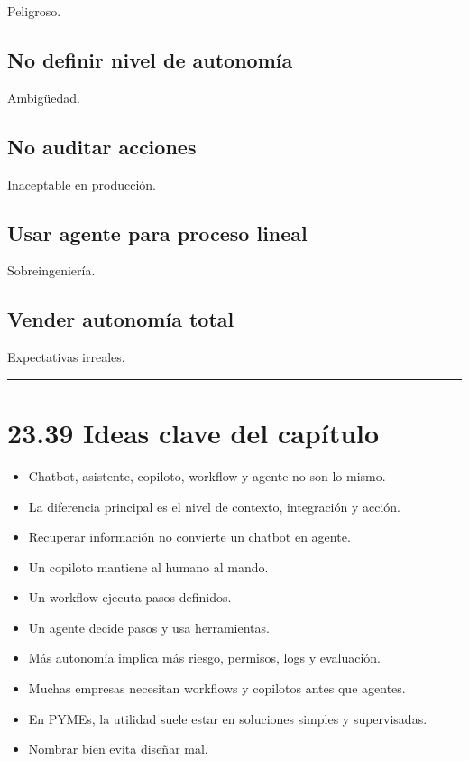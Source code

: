 Peligroso.

\subsection{No definir nivel de
autonomía}\label{no-definir-nivel-de-autonomuxeda}

Ambigüedad.

\subsection{No auditar acciones}\label{no-auditar-acciones}

Inaceptable en producción.

\subsection{Usar agente para proceso
lineal}\label{usar-agente-para-proceso-lineal}

Sobreingeniería.

\subsection{Vender autonomía total}\label{vender-autonomuxeda-total}

Expectativas irreales.

\begin{center}\rule{0.5\linewidth}{0.5pt}\end{center}

\section{23.39 Ideas clave del
capítulo}\label{ideas-clave-del-capuxedtulo-22}

\begin{itemize}
\tightlist
\item
  Chatbot, asistente, copiloto, workflow y agente no son lo mismo.
\item
  La diferencia principal es el nivel de contexto, integración y acción.
\item
  Recuperar información no convierte un chatbot en agente.
\item
  Un copiloto mantiene al humano al mando.
\item
  Un workflow ejecuta pasos definidos.
\item
  Un agente decide pasos y usa herramientas.
\item
  Más autonomía implica más riesgo, permisos, logs y evaluación.
\item
  Muchas empresas necesitan workflows y copilotos antes que agentes.
\item
  En PYMEs, la utilidad suele estar en soluciones simples y
  supervisadas.
\item
  Nombrar bien evita diseñar mal.
\end{itemize}

